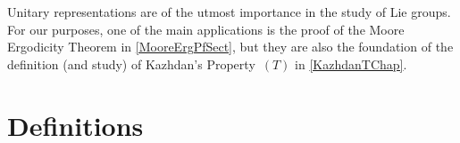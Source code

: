 
 \label{UnitaryRepChap}


Unitary representations are of the utmost importance in the study of Lie groups. For our purposes, one of the main applications is the proof of the Moore Ergodicity Theorem  in \cref{MooreErgPfSect}, but they are also the foundation of the definition (and study) of Kazhdan's Property~$(T)$ in \cref{KazhdanTChap}.



\section{Definitions} \label{UnitaryRepSect}

